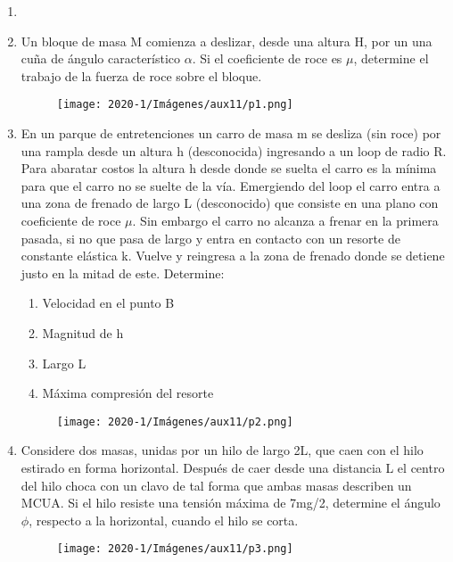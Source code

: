 \documentclass[letterpaper,11pt]{article}
\begin{document}
\vspace{-1cm}
\begin{enumerate}\setlength{\itemsep}{0.4cm}


\item[]

\item Un bloque de masa M comienza a deslizar, desde una altura H, por un una cuña de ángulo característico $\alpha$. Si el coeficiente de roce es $\mu$, determine el trabajo de la fuerza de roce sobre el bloque. 
\begin{figure}[h!]
    \centering
    \texttt{[image: 2020-1/Imágenes/aux11/p1.png]}
\end{figure}

\item En un parque de entretenciones un carro de masa m se desliza (sin roce) por una rampla desde un altura h (desconocida) ingresando a un loop de radio R. Para abaratar costos la altura h desde donde se suelta el carro es la mínima para que el carro no se suelte de la vía. Emergiendo del loop el carro entra a una zona de frenado de largo L (desconocido) que consiste en una plano con coeficiente de roce $\mu$. Sin embargo el carro no alcanza a frenar en la primera pasada, si no que pasa de largo y entra en contacto con un resorte de constante elástica k. Vuelve y reingresa a la zona de frenado donde se detiene justo en la mitad de este. Determine:
\begin{enumerate}
    \item Velocidad en el punto B
    \item Magnitud de h
    \item Largo L
    \item Máxima compresión del resorte
\end{enumerate}
\begin{figure}[h!]
    \centering
    \texttt{[image: 2020-1/Imágenes/aux11/p2.png]}
\end{figure}
\newpage
\item Considere dos masas, unidas por un hilo de largo 2L, que caen con el hilo estirado en forma horizontal. Después de caer desde una distancia L el centro del hilo choca con un clavo de tal forma que ambas masas describen un MCUA. Si el hilo resiste una tensión máxima de 7mg/2, determine el ángulo $\phi$, respecto a la horizontal, cuando el hilo se corta.
\begin{figure}[h!]
    \centering
    \texttt{[image: 2020-1/Imágenes/aux11/p3.png]}
\end{figure}

\end{enumerate}
\end{document}
